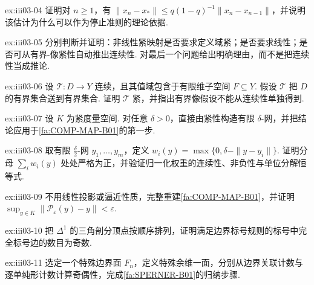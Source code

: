 \begin{FAExercise}{ex:iii03-04}
证明对 \(\displaystyle n\geqslant1\)，有 \(\displaystyle \|x_n-x_*\|\leqslant q(1-q)^{-1}\|x_n-x_{n-1}\|\)，并说明该估计为什么可以作为停止准则的理论依据.
\end{FAExercise}

\begin{FAExercise}[非线性紧映射的定义边界]{ex:iii03-05}
分别判断并证明：非线性紧映射是否要求定义域紧；是否要求线性；是否可从有界-像紧性自动推出连续性. 对最后一个问题给出明确理由，而不是把连续性当成推论.
\end{FAExercise}

\begin{FAExercise}[有限维值域的非线性紧性]{ex:iii03-06}
设 \(\displaystyle \mathcal T:D\to Y\) 连续，且其值域包含于有限维子空间 \(\displaystyle F\subseteq Y\). 假设 \(\displaystyle \mathcal T\) 把 \(\displaystyle D\) 的有界集合送到有界集合. 证明 \(\displaystyle \mathcal T\) 紧，并指出有界像假设不能从连续性单独得到.
\end{FAExercise}

\begin{FAExercise}[紧集合的有限网]{ex:iii03-07}
设 \(\displaystyle K\) 为紧度量空间. 对任意 \(\displaystyle \delta>0\)，直接由紧性构造有限 \(\displaystyle \delta\)-网，并把结论应用于\autoref{fa:COMP-MAP-B01}的第一步.
\end{FAExercise}

\begin{FAExercise}[重心权重]{ex:iii03-08}
取有限 \(\displaystyle \frac{\delta}{2}\)-网 \(\displaystyle y_1,\dots,y_m\)，定义 \(\displaystyle w_i(y)=\max\{0,\delta-\|y-y_i\|\}\). 证明分母 \(\displaystyle \sum_iw_i(y)\) 处处严格为正，并验证归一化权重的连续性、非负性与单位分解恒等式.
\end{FAExercise}

\begin{FAExercise}[完整重建紧像的非线性有限维逼近]{ex:iii03-09}
不用线性投影或逼近性质，完整重建\autoref{fa:COMP-MAP-B01}，并证明 \(\displaystyle \sup_{y\in K}\|\mathcal P_{\varepsilon}(y)-y\|<\varepsilon\).
\end{FAExercise}

\begin{FAExercise}[Sperner的 \(\displaystyle n=1\) 情形]{ex:iii03-10}
把 \(\displaystyle \Delta^1\) 的三角剖分顶点按顺序排列，证明满足边界标号规则的标号中完全标号边的数目为奇数.
\end{FAExercise}

\begin{FAExercise}{ex:iii03-11}
选定一个特殊边界面 \(\displaystyle F_n\)，定义特殊余维一面，分别从边界关联计数与逐单纯形计数计算奇偶性，完成\autoref{fa:SPERNER-B01}的归纳步骤.
\end{FAExercise}

